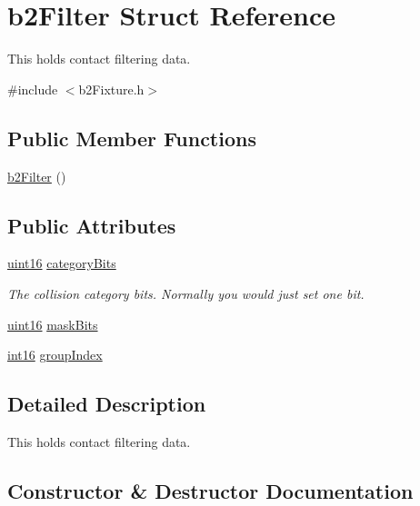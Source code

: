 \hypertarget{structb2_filter}{}\section{b2\+Filter Struct Reference}
\label{structb2_filter}


This holds contact filtering data.  




{\ttfamily \#include $<$b2\+Fixture.\+h$>$}

\subsection*{Public Member Functions}
\begin{DoxyCompactItemize}
\item 
\mbox{\hyperlink{structb2_filter_aeb3c0a8af990a7a3f06ae18312be50d4}{b2\+Filter}} ()
\end{DoxyCompactItemize}
\subsection*{Public Attributes}
\begin{DoxyCompactItemize}
\item 
\mbox{\hyperlink{b2_settings_8h_a05f6b0ae8f6a6e135b0e290c25fe0e4e}{uint16}} \mbox{\hyperlink{structb2_filter_a368907397168d39af8b4fc5201d50bba}{category\+Bits}}
\begin{DoxyCompactList}\small\item\em The collision category bits. Normally you would just set one bit. \end{DoxyCompactList}\item 
\mbox{\hyperlink{b2_settings_8h_a05f6b0ae8f6a6e135b0e290c25fe0e4e}{uint16}} \mbox{\hyperlink{structb2_filter_a533cccf85e3ba3d9e3700d73b819f6e2}{mask\+Bits}}
\item 
\mbox{\hyperlink{b2_settings_8h_a259fa4834387bd68627ddf37bb3ebdb9}{int16}} \mbox{\hyperlink{structb2_filter_a572a8f4a1672f6d5d71123a35e872950}{group\+Index}}
\end{DoxyCompactItemize}


\subsection{Detailed Description}
This holds contact filtering data. 

\subsection{Constructor \& Destructor Documentation}
\mbox{\label{structb2_filter_aeb3c0a8af990a7a3f06ae18312be50d4}} 
